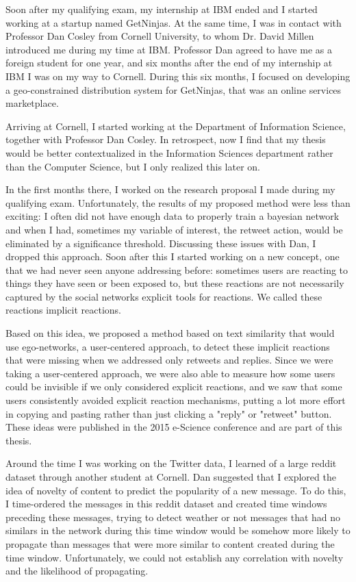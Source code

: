 Soon after my qualifying exam, my internship at IBM ended and I started working at a startup named GetNinjas. At the same time, I was in contact with Professor Dan Cosley from Cornell University, to whom Dr. David Millen introduced me during my time at IBM. Professor Dan agreed to have me as a foreign student for one year, and six months after the end of my internship at IBM I was on my way to Cornell. During this six months, I focused on developing a geo-constrained distribution system for GetNinjas, that was an online services marketplace.

Arriving at Cornell, I started working at the Department of Information Science, together with Professor Dan Cosley. In retrospect, now I find that my thesis would be better contextualized in the Information Sciences department rather than the Computer Science, but I only realized this later on. 

In the first months there, I worked on the research proposal I made during my qualifying exam. Unfortunately, the results of my proposed method were less than exciting: I often did not have enough data to properly train a bayesian network and when I had, sometimes my variable of interest, the retweet action, would be eliminated by a significance threshold. Discussing these issues with Dan, I dropped this approach. Soon after this I started working on a new concept, one that we had never seen anyone addressing before: sometimes users are reacting to things they have seen or been exposed to, but these reactions are not necessarily captured by the social networks explicit tools for reactions. We called these reactions implicit reactions.

Based on this idea, we proposed a method based on text similarity that would use ego-networks, a user-centered approach, to detect these implicit reactions that were missing when we addressed only retweets and replies. Since we were taking a user-centered approach, we were also able to measure how some users could be invisible if we only considered explicit reactions, and we saw that some users consistently avoided explicit reaction mechanisms, putting a lot more effort in copying and pasting rather than just clicking a "reply" or "retweet" button. These ideas were published in the 2015 e-Science conference and are part of this thesis.

Around the time I was working on the Twitter data, I learned of a large reddit dataset through another student at Cornell. Dan suggested that I explored the idea of novelty of content to predict the popularity of a new message. To do this, I time-ordered the messages in this reddit dataset and created time windows preceding these messages, trying to detect weather or not messages that had no similars in the network during this time window would be somehow more likely to propagate than messages that were more similar to content created during the time window. Unfortunately, we could not establish any correlation with novelty and the likelihood of propagating.

